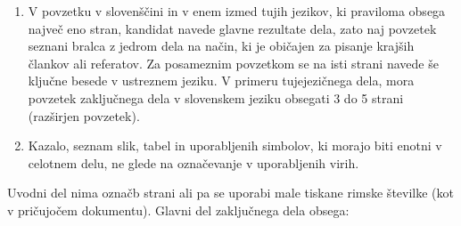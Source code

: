 \documentclass[a4paper,twoside,openright,12pt,slovene]{book}
\begin{document}
\begin{enumerate}
\item V povzetku v slovenščini in v enem izmed tujih jezikov, ki praviloma obsega največ eno stran, kandidat navede glavne rezultate dela, zato naj povzetek seznani bralca z jedrom dela na način, ki je običajen za pisanje krajših člankov ali referatov. Za posameznim povzetkom se na isti strani navede še ključne besede v ustreznem jeziku. V primeru tujejezičnega dela, mora povzetek zaključnega dela v slovenskem jeziku obsegati 3 do 5 strani (razširjen povzetek).

\item Kazalo, seznam slik, tabel in uporabljenih simbolov, ki morajo biti enotni v celotnem delu, ne glede na označevanje v uporabljenih virih.

\end{enumerate}

Uvodni del nima označb strani ali pa se uporabi male tiskane rimske številke (kot v pričujočem dokumentu). Glavni del zaključnega dela obsega:
\end{document}
